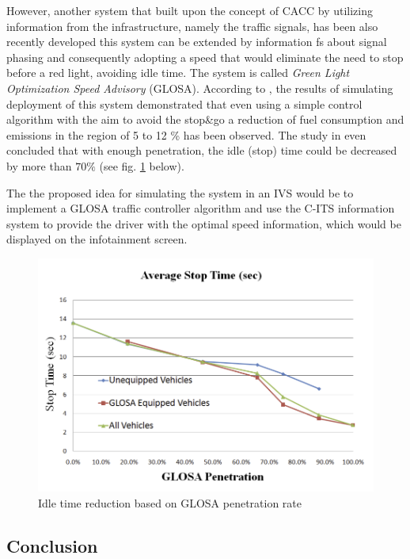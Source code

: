 \documentclass[main.tex]{subfiles}
\begin{document}
However, another system that built upon the concept of CACC by utilizing information from the
infrastructure, namely the traffic signals, has been also recently developed this system can be
extended by information fs about signal phasing and consequently adopting a speed that would
eliminate the need to stop before a red light, avoiding idle time. The system is called
\emph{Green Light Optimization Speed Advisory} (GLOSA). According to \cite{Pariota_2019}, the results 
of simulating deployment of this system demonstrated that even using a simple
control algorithm with the aim to avoid the stop\&go a reduction of fuel consumption
and emissions in the region of 5 to 12 \% has been observed. The study in \cite{Katsaros_2011} even 
concluded that with enough penetration, the idle (stop) time could be decreased by more than $70 \%$ 
(see fig. \ref{glosa-chart} below).

The the proposed idea for simulating the system in an IVS would be to implement a GLOSA traffic controller 
algorithm and use the C-ITS information system to provide the driver with the optimal speed information, which 
would be displayed on the infotainment screen.

\begin{figure}[htbp]
    \centering
    \includegraphics[width=.8\textwidth]{glosa-perf-chart.png} 
    \caption{Idle time reduction based on GLOSA penetration rate \cite{Katsaros_2011}}
    \label{glosa-chart}
\end{figure}

\subsection{Conclusion}
\end{document}
